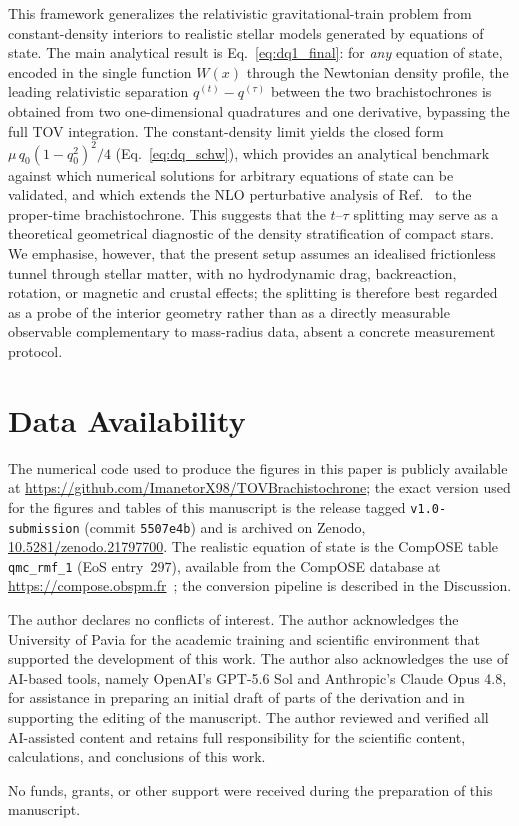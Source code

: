 \documentclass[
  aps,
  prd,
  twocolumn,
  nofootinbib,
  superscriptaddress,
  longbibliography
]{revtex4-2}
\begin{document}
This framework generalizes the relativistic gravitational-train problem
from constant-density interiors to realistic stellar models generated
by equations of state. The main analytical result is
Eq.~\eqref{eq:dq1_final}: for \emph{any} equation of state, encoded
in the single function $W(x)$ through the Newtonian density profile,
the leading relativistic separation $q^{(t)}-q^{(\tau)}$ between the
two brachistochrones is obtained from two one-dimensional
quadratures and one derivative, bypassing the full TOV integration.
The constant-density limit yields the closed form $\mu\,q_0(1-q_0^2)^2/4$
(Eq.~\eqref{eq:dq_schw}), which provides an analytical benchmark
against which numerical solutions for arbitrary equations of state can
be validated, and which extends the NLO perturbative analysis of
Ref.~\cite{Rosignoli2026} to the proper-time brachistochrone.
This suggests that the $t$--$\tau$ splitting may serve as a
theoretical geometrical diagnostic of the density stratification of
compact stars. We emphasise, however, that the present setup assumes an
idealised frictionless tunnel through stellar matter, with no
hydrodynamic drag, backreaction, rotation, or magnetic and crustal
effects; the splitting is therefore best regarded as a probe of the
interior geometry rather than as a directly measurable observable
complementary to mass-radius data, absent a concrete measurement
protocol.

\section*{Data Availability}
The numerical code used to produce the figures in this paper
is publicly available at
\url{https://github.com/ImanetorX98/TOVBrachistochrone}; the exact
version used for the figures and tables of this manuscript is the
release tagged \texttt{v1.0-submission} (commit
\texttt{5507e4b}) and is archived on Zenodo,
\href{https://doi.org/10.5281/zenodo.21797700}{10.5281/zenodo.21797700}.
The realistic equation of state is the CompOSE table
\texttt{qmc\_rmf\_1} (EoS entry~$297$), available from the CompOSE
database at \url{https://compose.obspm.fr}~\cite{Compose}; the
conversion pipeline is described in the Discussion.

\begin{acknowledgments}
The author declares no conflicts of interest.
The author acknowledges the University of Pavia for the academic
training and scientific environment that supported the development of
this work. The author also acknowledges the use of AI-based tools,
namely OpenAI’s GPT-5.6 Sol and Anthropic’s Claude Opus 4.8,
for assistance in preparing an initial draft of parts of the derivation
and in supporting the editing of the manuscript. The author reviewed
and verified all AI-assisted content and retains full responsibility
for the scientific content, calculations, and conclusions of this work.

No funds, grants, or other support were received during the preparation
of this manuscript.
\end{acknowledgments}
\end{document}
